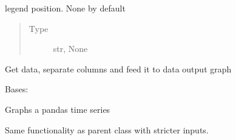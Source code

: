 \documentclass[letterpaper,10pt,english]{sphinxmanual}
\begin{document}
\begin{fulllineitems}
\begin{fulllineitems}
\label{\detokenize{dalio.application:dalio.application.PandasXYGrapher._legend}}
legend position. None by default
\begin{quote}\begin{description}
\item[{Type}] \leavevmode
str, None

\end{description}\end{quote}

\end{fulllineitems}


\begin{fulllineitems}
\label{\detokenize{dalio.application:dalio.application.PandasXYGrapher.run}}
Get data, separate columns and feed it to data output graph

\end{fulllineitems}


\end{fulllineitems}


\begin{fulllineitems}
\label{\detokenize{dalio.application:dalio.application.PandasTSGrapher}}
Bases: {\hyperref[\detokenize{dalio.application:dalio.application.graphers.PandasXYGrapher}]{}}

Graphs a pandas time series

Same functionality as parent class with stricter inputs.

\end{fulllineitems}

\end{document}
